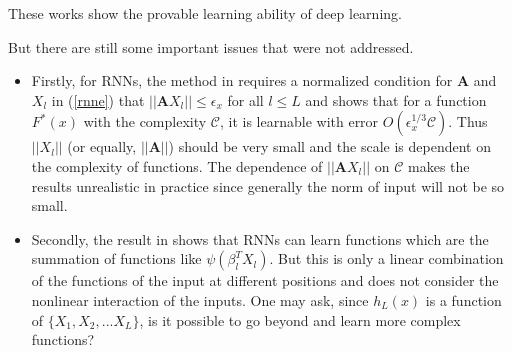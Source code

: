 \documentclass{article}
\begin{document}
These works show the provable learning ability of deep learning.

But there are still some important issues that were not addressed.
\begin{itemize}
	\item[$\bullet$] Firstly, for RNNs, the method in \cite{allenzhu2019sgd} requires a normalized condition for $\bm{A}$ and $X_l$ in (\ref{rnne}) that $||\bm{A}X_l||\leq \epsilon_x$ for all $l\leq L$ and shows that for a function $F^*(x)$ with the complexity $\mathscr{C}$, it is learnable with error $O(\epsilon^{1/3}_x\mathscr{C})$.  Thus $ ||X_l||$ (or equally, $||\bm{A}||$) should be very small and the scale is dependent on the complexity of functions. The dependence of $||\bm{A}X_l||$ on $\mathscr{C}$ makes the results unrealistic in practice since generally the norm of input will not be so small.
	
	\item[$\bullet$]Secondly, the result in  \cite{allenzhu2019sgd} shows that RNNs can learn functions which are the summation of functions like $\psi(\beta^T_{l}X_l)$. But this is only a linear combination of the functions of the input at different positions and does not consider the nonlinear interaction of the inputs. One may ask, since $h_{L}(x)$ is a function of $\{X_1,X_2,...X_L\}$, is it possible to go beyond and learn more complex functions?
\end{itemize}
\end{document}

